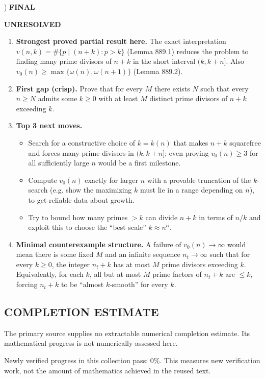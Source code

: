 ) \textbf{FINAL}

\noindent \textbf{UNRESOLVED}
\begin{enumerate}
\item[(i)] \textbf{Strongest proved partial result here.} The exact interpretation $v(n,k)=\#\{p\mid(n+k):p>k\}$ (Lemma 889.1) reduces the problem to finding many prime divisors of $n+k$ in the short interval $(k,k+n]$. Also $v_0(n)\ge \max\{\omega(n),\omega(n+1)\}$ (Lemma 889.2).
\item[(ii)] \textbf{First gap (crisp).} Prove that for every $M$ there exists $N$ such that every $n\ge N$ admits some $k\ge 0$ with at least $M$ distinct prime divisors of $n+k$ exceeding $k$.
\item[(iii)] \textbf{Top 3 next moves.}
  \begin{itemize}
  \item Search for a constructive choice of $k=k(n)$ that makes $n+k$ squarefree and forces many prime divisors in $(k,k+n]$; even proving $v_0(n)\ge 3$ for all sufficiently large $n$ would be a first milestone.
  \item Compute $v_0(n)$ exactly for larger $n$ with a provable truncation of the $k$-search (e.g. show the maximizing $k$ must lie in a range depending on $n$), to get reliable data about growth.
  \item Try to bound how many primes $>k$ can divide $n+k$ in terms of $n/k$ and exploit this to choose the ``best scale'' $k\approx n^{\alpha}$.
  \end{itemize}
\item[(iv)] \textbf{Minimal counterexample structure.} A failure of $v_0(n)\to\infty$ would mean there is some fixed $M$ and an infinite sequence $n_t\to\infty$ such that for every $k\ge 0$, the integer $n_t+k$ has at most $M$ prime divisors exceeding $k$. Equivalently, for each $k$, all but at most $M$ prime factors of $n_t+k$ are $\le k$, forcing $n_t+k$ to be ``almost $k$-smooth'' for every $k$.
\end{enumerate}



\subsection*{COMPLETION ESTIMATE}
The primary source supplies no extractable numerical completion estimate. Its mathematical progress is not numerically assessed here.

Newly verified progress in this collection pass: $0\%$. This measures new verification work, not the amount of mathematics achieved in the reused text.
